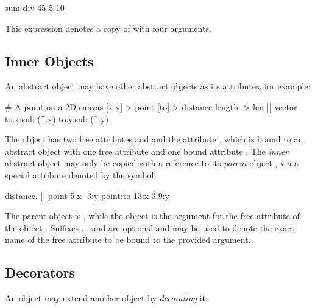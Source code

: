 \begin{ffcode}
sum div 45 5 10
\end{ffcode}

This expression denotes a copy of  with four arguments.

\subsection{Inner Objects}

An abstract object may have other abstract objects as its attributes,
for example:

\begin{ffcode}
# A point on a 2D canvas
[x y] > point
  [to] > distance
    length. > len |$\label{ln:vector-length}$|
      vector
        to.x.sub (^.x)
        to.y.sub (^.y)
\end{ffcode}

The object  has two free attributes  and 
and the attribute , which is bound to an abstract
object with one free attribute  and one bound attribute .
The \emph{inner} abstract object  may only be copied
with a reference to its \emph{parent} object , via
a special attribute denoted by the \ff{\^{}} symbol:

\begin{ffcode}
distance. |$\label{ln:point-copy}$|
  point
    5:x
    -3:y
  point:to
    13:x
    3.9:y
\end{ffcode}

The parent object is , while the object 
is the argument for the free attribute  of the object .
Suffixes , , and  are optional and may be used
to denote the exact name of the free attribute to be bound to the
provided argument.

\subsection{Decorators}

An object may extend another object by \emph{decorating} it:


